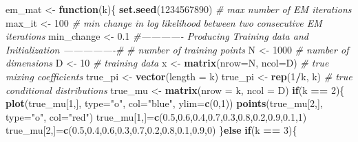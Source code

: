 \documentclass[]{article}
\newenvironment{Shaded}{\begin{snugshade}}{\end{snugshade}}
\newcommand{\KeywordTok}[1]{\textcolor[rgb]{0.13,0.29,0.53}{\textbf{#1}}}
\newcommand{\DataTypeTok}[1]{\textcolor[rgb]{0.13,0.29,0.53}{#1}}
\newcommand{\DecValTok}[1]{\textcolor[rgb]{0.00,0.00,0.81}{#1}}
\newcommand{\FloatTok}[1]{\textcolor[rgb]{0.00,0.00,0.81}{#1}}
\newcommand{\StringTok}[1]{\textcolor[rgb]{0.31,0.60,0.02}{#1}}
\newcommand{\CommentTok}[1]{\textcolor[rgb]{0.56,0.35,0.01}{\textit{#1}}}
\newcommand{\ControlFlowTok}[1]{\textcolor[rgb]{0.13,0.29,0.53}{\textbf{#1}}}
\newcommand{\OperatorTok}[1]{\textcolor[rgb]{0.81,0.36,0.00}{\textbf{#1}}}
\newcommand{\NormalTok}[1]{#1}
\begin{document}
\begin{Shaded}
\begin{Highlighting}[]
\NormalTok{em_mat <-}\StringTok{ }\ControlFlowTok{function}\NormalTok{(k)\{}
\KeywordTok{set.seed}\NormalTok{(}\DecValTok{1234567890}\NormalTok{)}
\CommentTok{# max number of EM iterations}
\NormalTok{max_it <-}\StringTok{ }\DecValTok{100}
\CommentTok{# min change in log likelihood between two consecutive EM iterations}
\NormalTok{min_change <-}\StringTok{ }\FloatTok{0.1}
\CommentTok{#------------- Producing Training data and Initialization ----------------#}
\CommentTok{# number of training points}
\NormalTok{N <-}\StringTok{ }\DecValTok{1000}
\CommentTok{# number of dimensions}
\NormalTok{D <-}\StringTok{ }\DecValTok{10}
\CommentTok{# training data}
\NormalTok{x <-}\StringTok{ }\KeywordTok{matrix}\NormalTok{(}\DataTypeTok{nrow=}\NormalTok{N, }\DataTypeTok{ncol=}\NormalTok{D)}
\CommentTok{# true mixing coefficients}
\NormalTok{true_pi <-}\StringTok{ }\KeywordTok{vector}\NormalTok{(}\DataTypeTok{length =}\NormalTok{ k)}
\NormalTok{true_pi <-}\StringTok{ }\KeywordTok{rep}\NormalTok{(}\DecValTok{1}\OperatorTok{/}\NormalTok{k, k)}
\CommentTok{# true conditional distributions}
\NormalTok{true_mu <-}\StringTok{ }\KeywordTok{matrix}\NormalTok{(}\DataTypeTok{nrow =}\NormalTok{ k, }\DataTypeTok{ncol =}\NormalTok{ D)}
\ControlFlowTok{if}\NormalTok{(k }\OperatorTok{==}\StringTok{ }\DecValTok{2}\NormalTok{)\{}
\KeywordTok{plot}\NormalTok{(true_mu[}\DecValTok{1}\NormalTok{,], }\DataTypeTok{type=}\StringTok{"o"}\NormalTok{, }\DataTypeTok{col=}\StringTok{"blue"}\NormalTok{, }\DataTypeTok{ylim=}\KeywordTok{c}\NormalTok{(}\DecValTok{0}\NormalTok{,}\DecValTok{1}\NormalTok{))}
\KeywordTok{points}\NormalTok{(true_mu[}\DecValTok{2}\NormalTok{,], }\DataTypeTok{type=}\StringTok{"o"}\NormalTok{, }\DataTypeTok{col=}\StringTok{"red"}\NormalTok{)}
\NormalTok{true_mu[}\DecValTok{1}\NormalTok{,]=}\KeywordTok{c}\NormalTok{(}\FloatTok{0.5}\NormalTok{,}\FloatTok{0.6}\NormalTok{,}\FloatTok{0.4}\NormalTok{,}\FloatTok{0.7}\NormalTok{,}\FloatTok{0.3}\NormalTok{,}\FloatTok{0.8}\NormalTok{,}\FloatTok{0.2}\NormalTok{,}\FloatTok{0.9}\NormalTok{,}\FloatTok{0.1}\NormalTok{,}\DecValTok{1}\NormalTok{)}
\NormalTok{true_mu[}\DecValTok{2}\NormalTok{,]=}\KeywordTok{c}\NormalTok{(}\FloatTok{0.5}\NormalTok{,}\FloatTok{0.4}\NormalTok{,}\FloatTok{0.6}\NormalTok{,}\FloatTok{0.3}\NormalTok{,}\FloatTok{0.7}\NormalTok{,}\FloatTok{0.2}\NormalTok{,}\FloatTok{0.8}\NormalTok{,}\FloatTok{0.1}\NormalTok{,}\FloatTok{0.9}\NormalTok{,}\DecValTok{0}\NormalTok{)}
\NormalTok{\}}\ControlFlowTok{else} \ControlFlowTok{if}\NormalTok{(k }\OperatorTok{==}\StringTok{ }\DecValTok{3}\NormalTok{)\{}

\end{Highlighting}
\end{Shaded}
\end{document}
